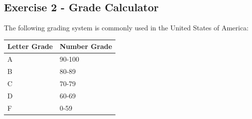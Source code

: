 \documentclass[12pt]{article}
\begin{document}
\subsection*{Exercise 2 - Grade Calculator} 

The following grading system is commonly used in the United States of America:
\begin{table}[!ht]
  \begin{center}
      \begin{tabular}{ | m{7em} | m{7em} | }
          \hline
          Letter Grade  & Number Grade    \\
          \hline
          A             & 90-100          \\
          \hline
          B             & 80-89           \\
          \hline
          C             & 70-79           \\
          \hline
          D             & 60-69           \\
          \hline
          F             & 0-59             \\
          \hline
      \end{tabular}
  \end{center}
\end{table}
\vspace{-1cm}
\end{document}
